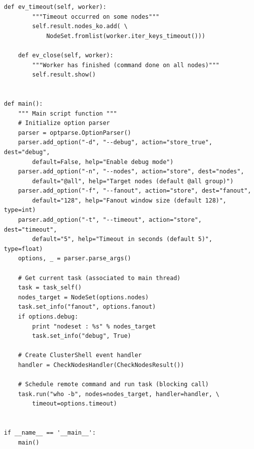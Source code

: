 \documentclass[english,a4paper]{csuserguide}
\begin{document}
\begin{lstlisting}[breaklines=true, breakatwhitespace=true]
    def ev_timeout(self, worker):
        """Timeout occurred on some nodes"""
        self.result.nodes_ko.add( \
        	NodeSet.fromlist(worker.iter_keys_timeout()))

    def ev_close(self, worker):
        """Worker has finished (command done on all nodes)"""
        self.result.show()


def main():
    """ Main script function """
    # Initialize option parser
    parser = optparse.OptionParser()
    parser.add_option("-d", "--debug", action="store_true", dest="debug",
        default=False, help="Enable debug mode")
    parser.add_option("-n", "--nodes", action="store", dest="nodes",
        default="@all", help="Target nodes (default @all group)")
    parser.add_option("-f", "--fanout", action="store", dest="fanout",
        default="128", help="Fanout window size (default 128)", type=int)
    parser.add_option("-t", "--timeout", action="store", dest="timeout",
        default="5", help="Timeout in seconds (default 5)", type=float)
    options, _ = parser.parse_args()

    # Get current task (associated to main thread)
    task = task_self()
    nodes_target = NodeSet(options.nodes)
    task.set_info("fanout", options.fanout)
    if options.debug:
        print "nodeset : %s" % nodes_target
        task.set_info("debug", True)

    # Create ClusterShell event handler
    handler = CheckNodesHandler(CheckNodesResult())

    # Schedule remote command and run task (blocking call)
    task.run("who -b", nodes=nodes_target, handler=handler, \
        timeout=options.timeout)


if __name__ == '__main__':
    main()
\end{lstlisting}


\newpage

\nocite{*}




\end{document}
